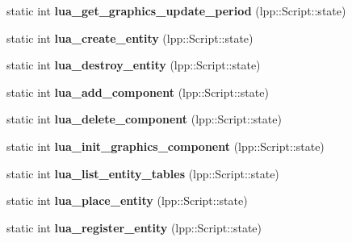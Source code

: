 \begin{DoxyCompactItemize}
\item 
static int {\bfseries lua\+\_\+get\+\_\+graphics\+\_\+update\+\_\+period} (lpp\+::\+Script\+::state)\hypertarget{class_lua_interface_adfdacd064355d32d549f0c740dd5b9b1}{}\label{class_lua_interface_adfdacd064355d32d549f0c740dd5b9b1}

\item 
static int {\bfseries lua\+\_\+create\+\_\+entity} (lpp\+::\+Script\+::state)\hypertarget{class_lua_interface_ab8f4dce13baedf367d30f3c9dedfd316}{}\label{class_lua_interface_ab8f4dce13baedf367d30f3c9dedfd316}

\item 
static int {\bfseries lua\+\_\+destroy\+\_\+entity} (lpp\+::\+Script\+::state)\hypertarget{class_lua_interface_ac83678419e517cef89d8d56f7a8a63aa}{}\label{class_lua_interface_ac83678419e517cef89d8d56f7a8a63aa}

\item 
static int {\bfseries lua\+\_\+add\+\_\+component} (lpp\+::\+Script\+::state)\hypertarget{class_lua_interface_a18c4f1aa91500373316671fa7bbb5d63}{}\label{class_lua_interface_a18c4f1aa91500373316671fa7bbb5d63}

\item 
static int {\bfseries lua\+\_\+delete\+\_\+component} (lpp\+::\+Script\+::state)\hypertarget{class_lua_interface_a41188b14d825bf0d70fa760c85f9c35e}{}\label{class_lua_interface_a41188b14d825bf0d70fa760c85f9c35e}

\item 
static int {\bfseries lua\+\_\+init\+\_\+graphics\+\_\+component} (lpp\+::\+Script\+::state)\hypertarget{class_lua_interface_a9fad9366996084ea04a1e2d952b6873e}{}\label{class_lua_interface_a9fad9366996084ea04a1e2d952b6873e}

\item 
static int {\bfseries lua\+\_\+list\+\_\+entity\+\_\+tables} (lpp\+::\+Script\+::state)\hypertarget{class_lua_interface_ad6b7bf47fb111bc9ff938c781ca865e9}{}\label{class_lua_interface_ad6b7bf47fb111bc9ff938c781ca865e9}

\item 
static int {\bfseries lua\+\_\+place\+\_\+entity} (lpp\+::\+Script\+::state)\hypertarget{class_lua_interface_a0a5dfe7bf03ab6cd75eb14949d3eb468}{}\label{class_lua_interface_a0a5dfe7bf03ab6cd75eb14949d3eb468}

\item 
static int {\bfseries lua\+\_\+register\+\_\+entity} (lpp\+::\+Script\+::state)\hypertarget{class_lua_interface_aa384e8c91dabe9e2468f1860ccc53846}{}\label{class_lua_interface_aa384e8c91dabe9e2468f1860ccc53846}


\end{DoxyCompactItemize}
